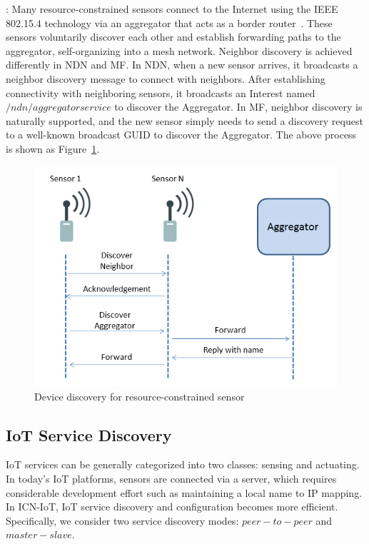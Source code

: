 \vspace{1mm}: Many resource-constrained sensors connect to the Internet using the IEEE 802.15.4 technology via an aggregator that acts as a border router~\cite{*cite Zigbee ipj*}. These sensors voluntarily discover each other and establish forwarding paths to the aggregator, self-organizing into a mesh network. Neighbor discovery is achieved differently in NDN and MF. In NDN, when a new sensor arrives, it broadcasts a neighbor discovery message to connect with neighbors. After establishing connectivity with neighboring sensors, it broadcasts an Interest named $/ndn/aggregatorservice$ to discover the Aggregator. In MF, neighbor discovery is naturally supported, and the new sensor simply needs to send a discovery request to a well-known broadcast GUID to discover the Aggregator. %
The above process is shown as Figure~\ref{fig:device_dis}.
\begin{figure}
\includegraphics[width=\columnwidth]{figure/device_discovery.png}
\caption{\label{fig:device_dis}Device discovery for resource-constrained sensor}
\end{figure}



\subsection{IoT Service Discovery}

IoT services can be generally categorized into two classes: sensing and actuating. In today's IoT platforms, sensors are connected via a server, which requires considerable development effort such as maintaining a local name to IP mapping. In ICN-IoT, IoT service discovery and configuration becomes more efficient. Specifically, we consider two service discovery modes: $peer-to-peer$ and $master-slave$.


